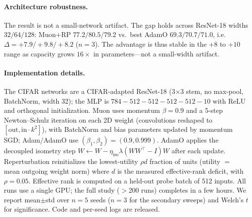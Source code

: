 \documentclass[letterpaper]{article} %
\begin{document}
\paragraph{Architecture robustness.} The result is not a small-network artifact. The gap holds across ResNet-18 widths $32/64/128$: Muon$+$RP $77.2/80.5/79.2$ vs.\ best AdamO $69.3/70.7/71.0$, i.e.\ $\Delta{=}{+}7.9/{+}9.8/{+}8.2$ ($n{=}3$). The advantage is thus stable in the $+8$ to $+10$ range as capacity grows $16\times$ in parameters---not a small-width artifact.

\paragraph{Implementation details.} The CIFAR networks are a CIFAR-adapted ResNet-18 (3$\times$3 stem, no max-pool, BatchNorm, width 32); the MLP is $784\!-\!512\!-\!512\!-\!512\!-\!512\!-\!10$ with ReLU and orthogonal initialization. Muon uses momentum $\beta{=}0.9$ and a 5-step Newton--Schulz iteration on each 2D weight (convolutions reshaped to $[\text{out},\text{in}\cdot k^2]$), with BatchNorm and bias parameters updated by momentum SGD; Adam/AdamO use $(\beta_1,\beta_2){=}(0.9,0.999)$. AdamO applies the decoupled isometry step $W\!\leftarrow\!W-\eta_{\text{iso}}\lambda(WW^\top\!-\!I)W$ after each update. Reperturbation reinitializes the lowest-utility $\rho d$ fraction of units (utility $=$ mean outgoing weight norm) where $d$ is the measured effective-rank deficit, with $\rho{=}0.05$. Effective rank is computed on a held-out probe batch of 512 inputs. All runs use a single GPU; the full study ($>$200 runs) completes in a few hours. We report mean$\pm$std over $n{=}5$ seeds ($n{=}3$ for the secondary sweeps) and Welch's $t$ for significance. Code and per-seed logs are released.
\end{document}
